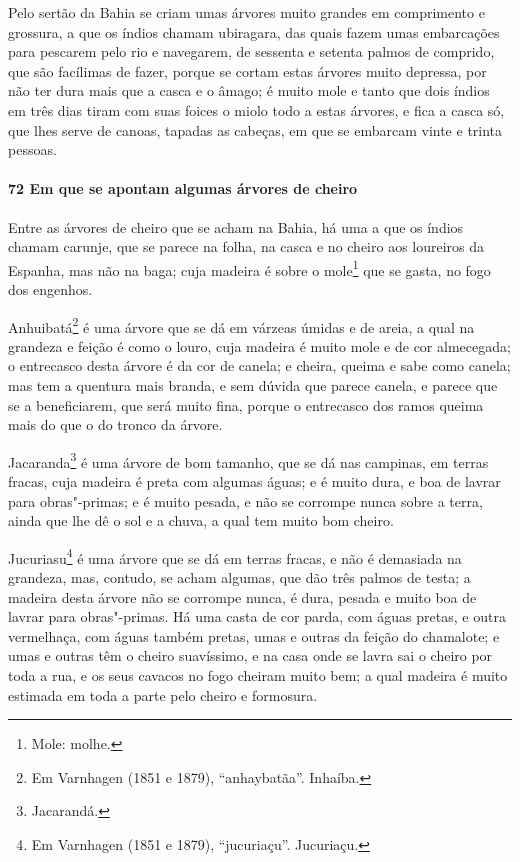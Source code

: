 \begin{linenumbers}
Pelo sertão da Bahia se criam umas árvores muito grandes em comprimento e grossura, a que
os índios chamam ubiragara, das quais fazem umas embarcações para pescarem pelo rio e
navegarem, de sessenta e setenta palmos de comprido, que são facílimas de fazer, porque se
cortam estas árvores muito depressa, por não ter dura mais que a casca e o âmago; é muito
mole e tanto que dois índios em três dias tiram com suas foices o miolo todo a estas
árvores, e fica a casca só, que lhes serve de canoas, tapadas as cabeças, em que se
embarcam vinte e trinta pessoas.

\paragraph{72 Em que se apontam algumas árvores de cheiro}\quad
Entre as árvores de cheiro que se acham na Bahia, há uma a que os índios chamam carunje,
que se parece na folha, na casca e no cheiro aos loureiros da Espanha, mas não na baga;
cuja madeira é sobre o mole\footnote{ Mole: molhe.} que se gasta, no fogo dos engenhos.


Anhuibatá\footnote{ Em Varnhagen (1851 e 1879), ``anhaybatãa''. Inhaíba.} é uma árvore que
se dá em várzeas úmidas e de areia, a qual na grandeza e feição é como o louro, cuja
madeira é muito mole e de cor almecegada; o entrecasco desta árvore é da cor de canela; e
cheira, queima e sabe como canela; mas tem a quentura mais branda, e sem dúvida que parece
canela, e parece que se a beneficiarem, que será muito fina, porque o entrecasco dos ramos
queima mais do que o do tronco da árvore.

Jacaranda\footnote{ Jacarandá.} é uma árvore de bom tamanho, que se dá nas campinas, em
terras fracas, cuja madeira é preta com algumas águas; e é muito dura, e boa de lavrar
para obras"-primas; e é muito pesada, e não se corrompe nunca sobre a terra, ainda que lhe
dê o sol e a chuva, a qual tem muito bom cheiro.

Jucuriasu\footnote{ Em Varnhagen (1851 e 1879), ``jucuriaçu''. Jucuriaçu.} é uma árvore
que se dá em terras fracas, e não é demasiada na grandeza, mas, contudo, se acham algumas,
que dão três palmos de testa; a madeira desta árvore não se corrompe nunca, é dura, pesada
e muito boa de lavrar para obras"-primas. Há uma casta de cor parda, com águas pretas, e
outra vermelhaça, com águas também pretas, umas e outras da feição do chamalote; e umas e
outras têm o cheiro suavíssimo, e na casa onde se lavra sai o cheiro por toda a rua, e os
seus cavacos no fogo cheiram muito bem; a qual madeira é muito estimada em toda a parte
pelo cheiro e formosura.


\end{linenumbers}
